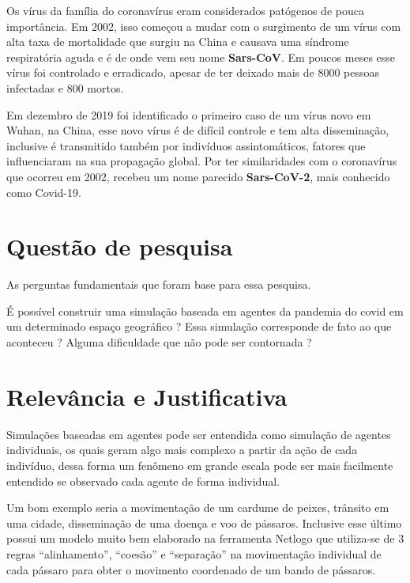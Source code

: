 Os vírus da família do coronavírus eram considerados patógenos de pouca importância. Em 2002, isso começou a mudar com o surgimento de um vírus com alta taxa de mortalidade que surgiu na China e causava uma síndrome respiratória aguda e é de onde vem seu nome \textbf{Sars-CoV}. Em poucos meses esse vírus foi controlado e erradicado, apesar de ter deixado mais de 8000 pessoas infectadas e 800 mortos.

Em dezembro de 2019 foi identificado o primeiro caso de um vírus novo em Wuhan, na China, esse novo vírus é de difícil controle e tem alta disseminação, inclusive é transmitido também por indivíduos assintomáticos, fatores que influenciaram na sua propagação global. Por ter similaridades com o coronavírus que ocorreu em 2002, recebeu um nome parecido \textbf{Sars-CoV-2}, mais conhecido como Covid-19. 


\section{Questão de pesquisa}%
As perguntas fundamentais que foram base para essa pesquisa.

É possível construir uma simulação baseada em agentes da pandemia do covid em um determinado espaço geográfico ?  Essa simulação corresponde de fato ao que aconteceu ? Alguma dificuldade que não pode ser contornada ?


\section{Relevância e Justificativa}%

Simulações baseadas em agentes pode ser entendida como simulação de agentes individuais, os quais geram algo mais complexo a partir da ação de cada indivíduo, dessa forma um fenômeno em grande escala pode ser mais facilmente entendido se observado cada agente de forma individual.

Um bom exemplo seria a movimentação de um cardume de peixes, trânsito em uma cidade, disseminação de uma doença e voo de pássaros. Inclusive esse último possui um modelo muito bem elaborado na ferramenta Netlogo que utiliza-se de 3 regras “alinhamento”, “coesão” e “separação” na movimentação individual de cada pássaro para obter o movimento coordenado de um bando de pássaros.

